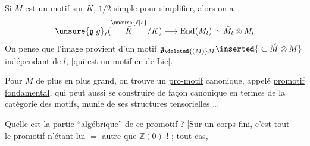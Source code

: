 Si $M$ est un motif sur $K$, $1/2$ simple pour simplifier, alors on a
\[
\unsure{\mathfrak g|g}_\ell(\overset{\unsure{\ell|s}}{\bar K}/K)\longrightarrow\operatorname{End}(M_l)\simeq\check M_l\otimes M_l
\]
On pense que l'image provient d'un motif $\mathfrak g_{\deleted{(M)}M}\inserted{{}\subset\check M\otimes M}$ indépendant de $l$, [qui est un motif en  de Lie].

Pour $M$ de plus en plus grand, on trouve un \uline{pro-motif}  canonique, appelé \uline{promotif fondamental}, qui peut aussi se construire de façon canonique en termes de la catégorie des motifs, munie de ses structures tensorielles \ldots

Quelle est la partie ``algébrique'' de ce promotif ? [Sur un corps fini, c'est tout -- le promotif n'étant lui-$=$ autre que $\mathbb Z(0)$ ! ;  tout  cas,   

